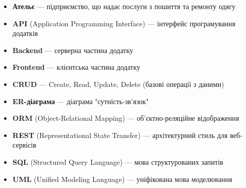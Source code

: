 \documentclass[14pt,a4paper]{extarticle}
\begin{document}
\begin{itemize}
    \item \textbf{Ательє} --- підприємство, що надає послуги з пошиття та ремонту одягу
    \item \textbf{API} (Application Programming Interface) --- інтерфейс програмування додатків
    \item \textbf{Backend} --- серверна частина додатку
    \item \textbf{Frontend} --- клієнтська частина додатку
    \item \textbf{CRUD} --- Create, Read, Update, Delete (базові операції з даними)
    \item \textbf{ER-діаграма} --- діаграма "сутність-зв'язок"
    \item \textbf{ORM} (Object-Relational Mapping) --- об'єктно-реляційне відображення
    \item \textbf{REST} (Representational State Transfer) --- архітектурний стиль для веб-сервісів
    \item \textbf{SQL} (Structured Query Language) --- мова структурованих запитів
    \item \textbf{UML} (Unified Modeling Language) --- уніфікована мова моделювання
\end{itemize}
\end{document}
